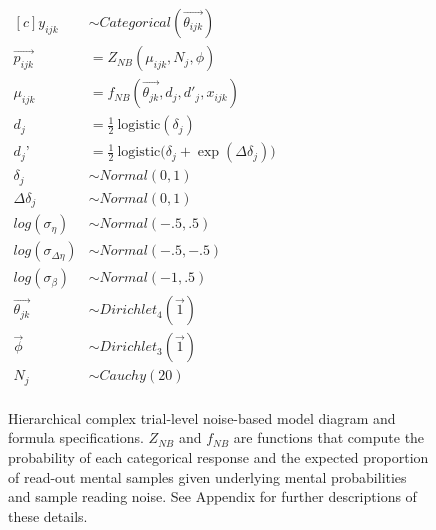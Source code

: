 \begin{figure}
\begin{minipage}{.5\textwidth}
  \end{minipage}%
  \begin{minipage}{.5\textwidth}
    \centering
    $
\begin{aligned}[c]
  y_{ijk} &\sim Categorical(\overrightarrow{\theta_{ijk}}) \\
  \overrightarrow{p_{ijk}} &= Z_{NB}(\mu_{ijk},N_j, \phi) \\
  \mu_{ijk} &= f_{NB}(\overrightarrow{\theta_{jk}}, d_j, d'_j, x_{ijk})  \\
  d_j &= \frac{1}{2} \ \text{logistic}(\delta_j) \\
  d_j’ &= \frac{1}{2} \ \text{logistic}\big(\delta_j + \exp(\Delta\delta_j)\big) \\
  \delta_j &\sim Normal(0,1) \\
  \Delta\delta_j &\sim Normal(0,1) \\
  log(\sigma_{\eta}) &\sim Normal(-.5, .5) \\
  log(\sigma_{\Delta\eta}) &\sim Normal(-.5, -.5) \\
  log(\sigma_{\beta}) &\sim Normal(-1, .5) \\
  \overrightarrow{\theta_{jk}} &\sim Dirichlet_4(\overrightarrow{1}) \\
  \overrightarrow{\phi} &\sim Dirichlet_3(\overrightarrow{1}) \\
  N_j &\sim Cauchy(20) \\
\end{aligned}
$
  \end{minipage}
  \caption{Hierarchical complex trial-level noise-based model diagram and formula specifications. $Z_{NB}$ and $f_{NB}$ are functions that compute the probability of each categorical response and the expected proportion of read-out mental samples given underlying mental probabilities and sample reading noise. See Appendix for further descriptions of these details.}
\end{figure}